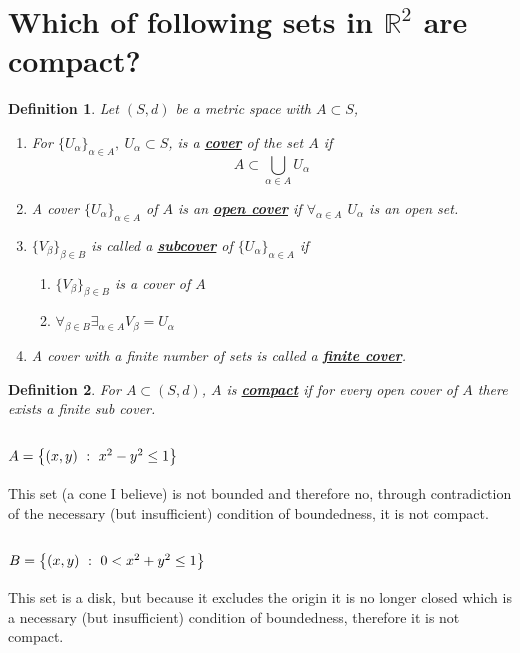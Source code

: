 \documentclass[]{article}
\newcommand{\R}{\mathbb{R}}
\newcommand{\st}{\ : \ }
\newtheorem{definition}{Definition}
\begin{document}
\section{Which of following sets in $\R^2$ are compact?}
\begin{definition}
    Let $(S,d)$ be a metric space with $A \subset S$,
    \begin{enumerate}
        \item For $\{U_\alpha\}_{\alpha \in A}, \ U_\alpha \subset S$, is a \textbf{\underline{cover}} of the set $A$ if 
        $$A \subset \bigcup_{\alpha\in A} U_\alpha$$
        \item A cover $\{U_\alpha\}_{\alpha \in A}$ of $A$ is an \textbf{\underline{open cover}} if $\forall_{\alpha \in A}$ $U_\alpha$ is an open set.
        \item $\{V_\beta\}_{\beta\in B}$ is called a \textbf{\underline{subcover}} of $\{U_\alpha\}_{\alpha \in A}$ if
        \begin{enumerate}
            \item $\{V_\beta\}_{\beta\in B}$ is a cover of $A$
            \item $\forall_{\beta \in B} \exists_{\alpha \in A} V_\beta = U_\alpha$
        \end{enumerate}
        \item A cover with a finite number of sets is called a \textbf{\underline{finite cover}}.
    \end{enumerate}
\end{definition}
\begin{definition}
    For $A \subset (S,d)$, $A$ is \textbf{\underline{compact}} if for every open cover of $A$ there exists a finite sub cover.
\end{definition}

\subsection{$A = \qty{(x,y) \st x^2 - y^2 \leq 1}$}
This set (a cone I believe) is not bounded and therefore no, through contradiction of the necessary (but insufficient) condition of boundedness, it is not compact.

\subsection{$B = \qty{(x,y) \st 0 < x^2 + y^2 \leq 1}$}
This set is a disk, but because it excludes the origin it is no longer closed which is a necessary (but insufficient) condition of boundedness, therefore it is not compact.
\end{document}
